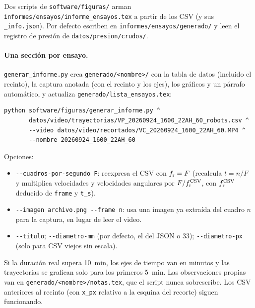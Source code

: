 Dos scripts de \nolinkurl{software/figuras/} arman \nolinkurl{informes/ensayos/informe_ensayos.tex}
a partir de los CSV (y sus \texttt{\_info.json}). Por defecto escriben en
\nolinkurl{informes/ensayos/generado/} y leen el registro de presión de \nolinkurl{datos/presion/crudos/}.

\paragraph{Una sección por ensayo.} \texttt{generar\_informe.py} crea \nolinkurl{generado/<nombre>/}
con la tabla de datos (incluido el recinto), la captura anotada (con el recinto y los ejes), los gráficos y
un párrafo automático, y actualiza \nolinkurl{generado/lista_ensayos.tex}:
\begin{verbatim}
python software/figuras/generar_informe.py ^
       datos/video/trayectorias/VP_20260924_1600_22AH_60_robots.csv ^
       --video datos/video/recortados/VC_20260924_1600_22AH_60.MP4 ^
       --nombre 20260924_1600_22AH_60
\end{verbatim}
Opciones:
\begin{itemize}
  \item \texttt{-{}-cuadros-por-segundo F}: reexpresa el CSV con $f_{\mathrm{r}} = F$ (recalcula $t = n/F$ y
        multiplica velocidades y velocidades angulares por $F/f_{\mathrm{r}}^{\mathrm{CSV}}$, con
        $f_{\mathrm{r}}^{\mathrm{CSV}}$ deducido de \texttt{frame} y \texttt{t\_s}).
  \item \texttt{-{}-imagen archivo.png -{}-frame n}: usa una imagen ya extraída del cuadro $n$ para la
        captura, en lugar de leer el video.
  \item \texttt{-{}-titulo}; \texttt{-{}-diametro-mm} (por defecto, el del JSON o 33);
        \texttt{-{}-diametro-px} (solo para CSV viejos sin escala).
\end{itemize}
Si la duración real supera \SI{10}{\minute}, los ejes de tiempo van en minutos y las trayectorias se
grafican solo para los primeros \SI{5}{\minute}. Las observaciones propias van en
\nolinkurl{generado/<nombre>/notas.tex}, que el script nunca sobrescribe. Los CSV anteriores al
recinto (con \texttt{x\_px} relativo a la esquina del recorte) siguen funcionando.

